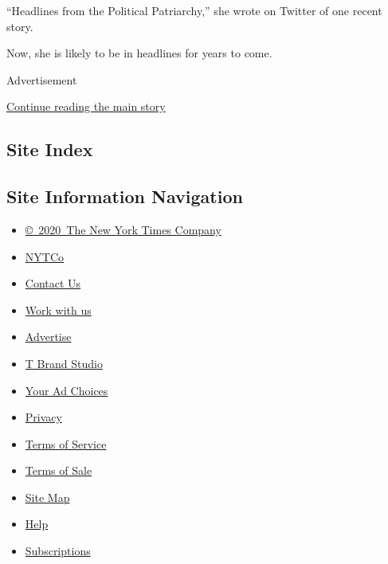 ``Headlines from the Political Patriarchy,'' she wrote on Twitter of one
recent story.

Now, she is likely to be in headlines for years to come.

Advertisement

\protect\hyperlink{after-bottom}{Continue reading the main story}

\hypertarget{site-index}{%
\subsection{Site Index}\label{site-index}}

\hypertarget{site-information-navigation}{%
\subsection{Site Information
Navigation}\label{site-information-navigation}}

\begin{itemize}
\tightlist
\item
  \href{https://help.nytimes.com/hc/en-us/articles/115014792127-Copyright-notice}{©~2020~The
  New York Times Company}
\end{itemize}

\begin{itemize}
\tightlist
\item
  \href{https://www.nytco.com/}{NYTCo}
\item
  \href{https://help.nytimes.com/hc/en-us/articles/115015385887-Contact-Us}{Contact
  Us}
\item
  \href{https://www.nytco.com/careers/}{Work with us}
\item
  \href{https://nytmediakit.com/}{Advertise}
\item
  \href{http://www.tbrandstudio.com/}{T Brand Studio}
\item
  \href{https://www.nytimes.com/privacy/cookie-policy\#how-do-i-manage-trackers}{Your
  Ad Choices}
\item
  \href{https://www.nytimes.com/privacy}{Privacy}
\item
  \href{https://help.nytimes.com/hc/en-us/articles/115014893428-Terms-of-service}{Terms
  of Service}
\item
  \href{https://help.nytimes.com/hc/en-us/articles/115014893968-Terms-of-sale}{Terms
  of Sale}
\item
  \href{https://spiderbites.nytimes.com}{Site Map}
\item
  \href{https://help.nytimes.com/hc/en-us}{Help}
\item
  \href{https://www.nytimes.com/subscription?campaignId=37WXW}{Subscriptions}
\end{itemize}
